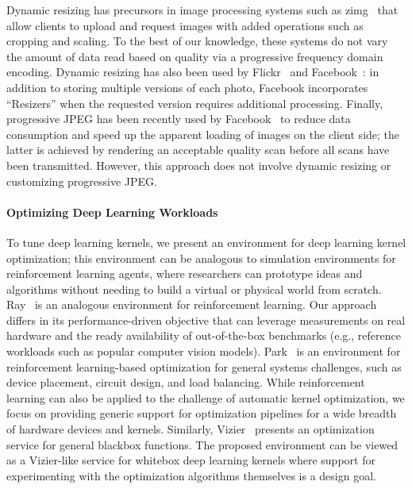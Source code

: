 Dynamic resizing has precursors in image processing systems such as zimg~\cite{zimg} that allow clients to upload and request images with added operations such as cropping and scaling. 
To the best of our knowledge, these systems do not vary the amount of data read based on quality via a progressive frequency domain encoding.
Dynamic resizing has also been used by Flickr~\cite{flickr} and Facebook~\cite{huang2013analysis}: in addition to storing multiple versions of each photo, Facebook incorporates ``Resizers'' when the requested version requires additional processing.
Finally, progressive JPEG has been recently used by Facebook~\cite{fasterfacebook} to reduce data consumption and speed up the apparent loading of images on the client side; the latter is achieved by rendering an acceptable quality scan before all scans have been transmitted. However, this approach does not involve dynamic resizing or customizing progressive JPEG\@.

\paragraph{Optimizing Deep Learning Workloads}
To tune deep learning kernels, we present an environment for deep learning kernel optimization; this environment can be analogous to simulation environments for reinforcement learning agents, where researchers can prototype ideas and algorithms without needing to build a virtual or physical world from scratch.
Ray~\cite{222605} is an analogous environment for reinforcement learning.
Our approach differs in its performance-driven objective that can leverage measurements on real hardware and the ready availability of out-of-the-box benchmarks (e.g., reference workloads such as popular computer vision models).
Park~\cite{mao2019park} is an environment for reinforcement learning-based optimization for general systems challenges, such as device placement, circuit design, and load balancing.
While reinforcement learning can also be applied to the challenge of automatic kernel optimization, we focus on providing generic support for optimization pipelines for a wide breadth of hardware devices and kernels.
Similarly, Vizier~\cite{golovin2017google} presents an optimization service for general blackbox functions.
The proposed environment can be viewed as a Vizier-like service for whitebox deep learning kernels where support for experimenting with the optimization algorithms themselves is a design goal.


